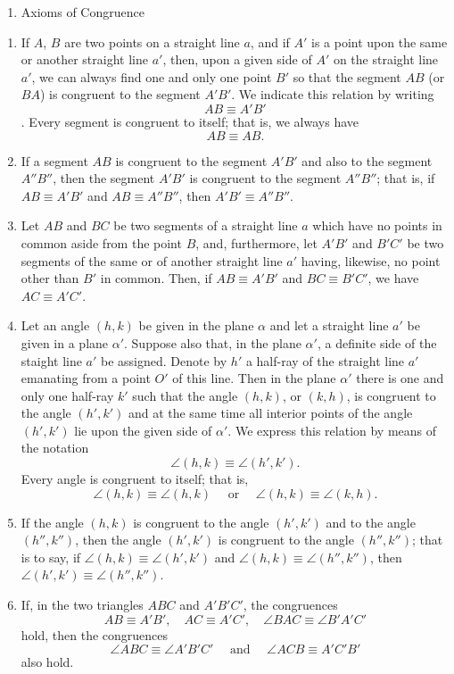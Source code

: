 \documentclass[
]{book}
\providecommand{\tightlist}{%
  \setlength{\itemsep}{0pt}\setlength{\parskip}{0pt}}
\theoremstyle{definition}
\theoremstyle{definition}
\theoremstyle{definition}
\theoremstyle{definition}
\theoremstyle{remark}
\begin{document}
\begin{enumerate}
\def\labelenumi{\Roman{enumi}.}
\setcounter{enumi}{3}
\tightlist
\item
  Axioms of Congruence
\end{enumerate}

\begin{enumerate}
\def\labelenumi{\arabic{enumi}.}
\tightlist
\item
  If \(A\), \(B\) are two points on a straight line \(a\), and if \(A'\) is a point upon the same or another straight line \(a'\), then, upon a given side of \(A'\) on the straight line \(a'\), we can always find one and only one point \(B'\) so that the segment \(AB\) (or \(BA\)) is congruent to the segment \(A'B'\). We indicate this relation by writing \[AB \equiv A'B'\].
  Every segment is congruent to itself; that is, we always have \[AB\equiv AB.\]
\item
  If a segment \(AB\) is congruent to the segment \(A'B'\) and also to the segment \(A''B''\), then the segment \(A'B'\) is congruent to the segment \(A''B''\); that is, if \(AB \equiv A'B'\) and \(AB\equiv A''B''\), then \(A'B' \equiv A''B''\).
\item
  Let \(AB\) and \(BC\) be two segments of a straight line \(a\) which have no points in common aside from the point \(B\), and, furthermore, let \(A'B'\) and \(B'C'\) be two segments of the same or of another straight line \(a'\) having, likewise, no point other than \(B'\) in common. Then, if \(AB\equiv A'B'\) and \(BC \equiv B'C'\), we have \(AC \equiv A'C'\).
\item
  Let an angle \((h,k)\) be given in the plane \(\alpha\) and let a straight line \(a'\) be given in a plane \(\alpha'\). Suppose also that, in the plane \(\alpha'\), a definite side of the staight line \(a'\) be assigned. Denote by \(h'\) a half-ray of the straight line \(a'\) emanating from a point \(O'\) of this line. Then in the plane \(\alpha'\) there is one and only one half-ray \(k'\) such that the angle \((h,k)\), or \((k,h)\), is congruent to the angle \((h',k')\) and at the same time all interior points of the angle \((h',k')\) lie upon the given side of \(\alpha'\). We express this relation by means of the notation \[\angle (h,k) \equiv \angle (h',k').\]
  Every angle is congruent to itself; that is, \[\angle (h,k) \equiv \angle (h,k)\quad \mbox{ or } \quad \angle (h,k) \equiv \angle (k,h).\]
\item
  If the angle \((h,k)\) is congruent to the angle \((h',k')\) and to the angle \((h'',k'')\), then the angle \((h',k')\) is congruent to the angle \((h'',k'')\); that is to say, if \(\angle (h,k) \equiv \angle (h',k')\) and \(\angle (h,k) \equiv \angle (h'',k'')\), then \(\angle (h',k') \equiv \angle (h'',k'')\).
\item
  If, in the two triangles \(ABC\) and \(A'B'C'\), the congruences \[AB \equiv A'B', \quad AC \equiv A'C', \quad \angle BAC \equiv \angle B'A'C'\] hold, then the congruences
  \[\angle ABC \equiv \angle A'B'C' \quad \mbox{ and } \quad \angle ACB \equiv A'C'B'\] also hold.
\end{enumerate}
\end{document}
